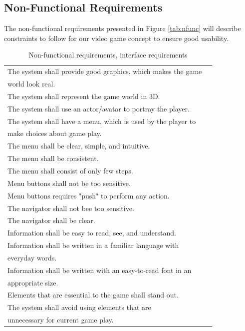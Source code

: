 \subsection{Non-Functional Requirements}
The non-functional requirements presented in Figure \ref{tab:nfunc} will describe constraints to follow for our video game concept to ensure good usability.

\begin{table} [H]
\label{tab:nfunc}
\centering
    \begin{tabular}{|l|l|}
 
       \hline
       The system shall provide good graphics, which makes the game \\ world look real. \\ \hline
	   The system shall represent the game world in 3D.\\ \hline
	   The system shall use an actor/avatar to portray the player.\\ \hline
	   The system shall have a menu, which is used by the player to \\ make choices about game play.\\ \hline
	   The menu shall be clear, simple, and intuitive.\\ \hline
	   The menu shall be consistent. \\ \hline
	   The menu shall consist of only few steps.\\ \hline
	   Menu buttons shall not be too sensitive.\\ \hline
	   Menu buttons requires "push" to perform any action.\\ \hline
	   The navigator shall not bee too sensitive. \\ \hline
	   The navigator shall be clear.\\ \hline
	   Information shall be easy to read, see, and understand.\\ \hline
	   Information shall be written in a familiar language with \\ everyday words.  \\ \hline
	   Information shall be written with an easy-to-read font in an \\ appropriate size. \\ \hline
	   Elements that are essential to the game shall stand out.\\ \hline
	   The system shall avoid using elements that are \\ unnecessary for current game play.\\ \hline
    \end{tabular}
    \caption[Non-functional requirements]{Non-functional requirements, interface requirements}
    \label{tab:agenda}
\end{table} 

